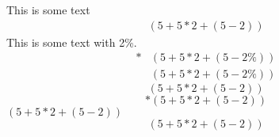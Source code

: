 This is some text
\begin{align}\label{equ1(good)}%
(5+5*2+(5-2))%
\end{align}
This is some text with 2\%.
\begin{align}*
&(5+5*2+(5-2\%))\\
&\left(5+5*2+\left(5-2\%\right)\right)
\end{align}
\begin{equation}\label{equ2(good)}
(5+5*2+(5-2))%
\end{equation}
\begin{equation}*
(5+5*2+(5-2))
\end{equation}
\((5+5*2+(5-2))\)
\[(5+5*2+(5-2))\]
